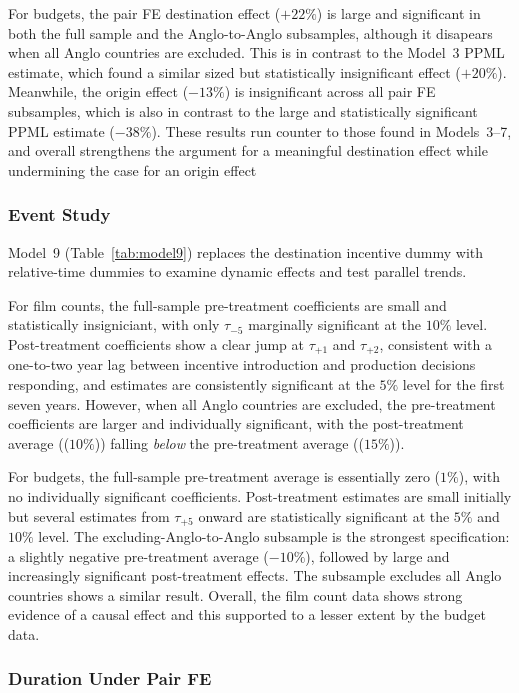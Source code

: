 For budgets, the pair FE destination effect ($+22\%$) is large and significant in both the full sample and the Anglo-to-Anglo subsamples, although it disapears when all Anglo countries are excluded. This is in contrast to the Model~3 PPML estimate, which found a similar sized but statistically insignificant effect ($+20\%$). Meanwhile, the origin effect ($-13\%$) is insignificant across all pair FE subsamples, which is also in contrast to the large and statistically significant PPML estimate ($-38\%$). These results run counter to those found in Models~3--7, and overall strengthens the argument for a meaningful destination effect while undermining the case for an origin effect

\subsubsection{Event Study}

Model~9 (Table~\ref{tab:model9}) replaces the destination incentive dummy with relative-time dummies to examine dynamic effects and test parallel trends.

For film counts, the full-sample pre-treatment coefficients are small and statistically insigniciant, with only $\tau_{-5}$ marginally significant at the $10\%$ level. Post-treatment coefficients show a clear jump at $\tau_{+1}$ and $\tau_{+2}$, consistent with a one-to-two year lag between incentive introduction and production decisions responding, and estimates are consistently significant at the $5\%$ level for the first seven years. However, when all Anglo countries are excluded, the pre-treatment coefficients are larger and individually significant, with the post-treatment average (($10\%$)) falling \textit{below} the pre-treatment average (($15\%$)).

For budgets, the full-sample pre-treatment average is essentially zero ($1\%$), with no individually significant coefficients. Post-treatment estimates are small initially but several estimates from $\tau_{+5}$ onward are statistically significant at the $5\%$ and $10\%$ level.  The excluding-Anglo-to-Anglo subsample is the strongest specification: a slightly negative pre-treatment average ($-10\%$), followed by large and increasingly significant post-treatment effects. The subsample excludes all Anglo countries shows a similar result. Overall, the film count data shows strong evidence of a causal effect and this supported to a lesser extent by the budget data.

\subsubsection{Duration Under Pair FE}


